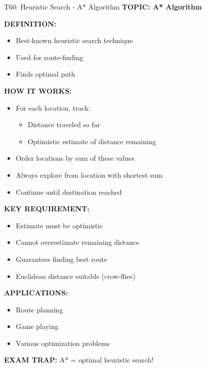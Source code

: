 \documentclass[8pt]{beamer}
\begin{document}
	\begin{frame}{T60: Heuristic Search - A* Algorithm}
		\fontsize{6.5}{7.5}\selectfont
		\textbf{TOPIC: A* Algorithm}
		
		\vspace{0.1cm}
		\textbf{DEFINITION:}
		\begin{itemize}
			\item Best-known heuristic search technique
			\item Used for route-finding
			\item Finds optimal path
		\end{itemize}
		
		\vspace{0.1cm}
		\textbf{HOW IT WORKS:}
		\begin{itemize}
			\item For each location, track:
			\begin{itemize}
				\item Distance traveled so far
				\item Optimistic estimate of distance remaining
			\end{itemize}
			\item Order locations by sum of these values
			\item Always explore from location with shortest sum
			\item Continue until destination reached
		\end{itemize}
		
		\vspace{0.1cm}
		\textbf{KEY REQUIREMENT:}
		\begin{itemize}
			\item Estimate must be optimistic
			\item Cannot overestimate remaining distance
			\item Guarantees finding best route
			\item Euclidean distance suitable (crow-flies)
		\end{itemize}
		
		\vspace{0.1cm}
		\textbf{APPLICATIONS:}
		\begin{itemize}
			\item Route planning
			\item Game playing
			\item Various optimization problems
		\end{itemize}
		
		\textcolor{myred}{\textbf{EXAM TRAP:}} A* = \textcolor{myblue}{optimal heuristic search}!
	\end{frame}
	
\end{document}
